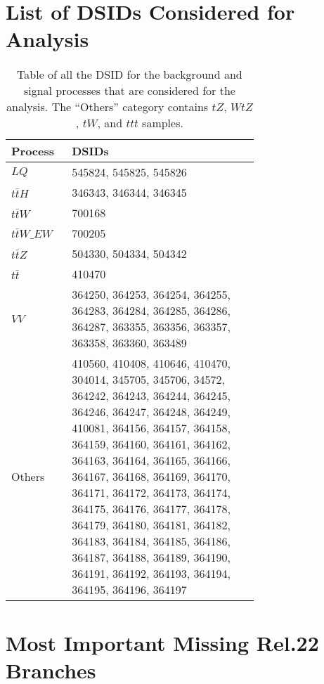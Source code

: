 \section{List of DSIDs Considered for Analysis}\label{DSIDs}
    \renewcommand{\arraystretch}{1.2}
    \begin{table}[h!]
        \centering
        \begin{tabular}{p{0.1\linewidth}|p{0.6\linewidth}}
            Process & DSIDs \\ \hline
            $LQ$        & 545824, 545825, 545826 \\ \hline
            $t\bar{t}H$ & 346343, 346344, 346345 \\ \hline
            $t\bar{t}W$ & 700168 \\ \hline
            $t\bar{t}W\_EW$ & 700205 \\ \hline
            $t\bar{t}Z$ & 504330, 504334, 504342 \\ \hline
            $t\bar{t}$  & 410470 \\ \hline 
            $VV$        & 364250, 364253, 364254, 364255, 364283, 364284, 364285, 364286, 364287, 363355, 363356, 363357, 363358, 363360, 363489 \\ \hline 
            Others      & 410560, 410408, 410646, 410470, 304014, 345705, 345706, 34572, 364242, 364243, 364244, 364245, 364246, 364247, 364248, 364249, 410081, 364156, 364157, 364158, 364159, 364160, 364161, 364162, 364163, 364164, 364165, 364166, 364167, 364168, 364169, 364170, 364171, 364172, 364173, 364174, 364175, 364176, 364177, 364178, 364179, 364180, 364181, 364182, 364183, 364184, 364185, 364186, 364187, 364188, 364189, 364190, 364191, 364192, 364193, 364194, 364195, 364196, 364197 \\[20pt]
        \end{tabular}
        \caption{Table of all the DSID for the background and signal processes that are considered for the analysis. The ``Others'' category contains $tZ$, $WtZ$, $tW$, and $ttt$ samples.}
        \label{signalAndBackgroundDSIDs}
    \end{table}
    \renewcommand{\arraystretch}{1}

\pagebreak
\section{Most Important Missing Rel.22 Branches}\label{MissingBranches}
